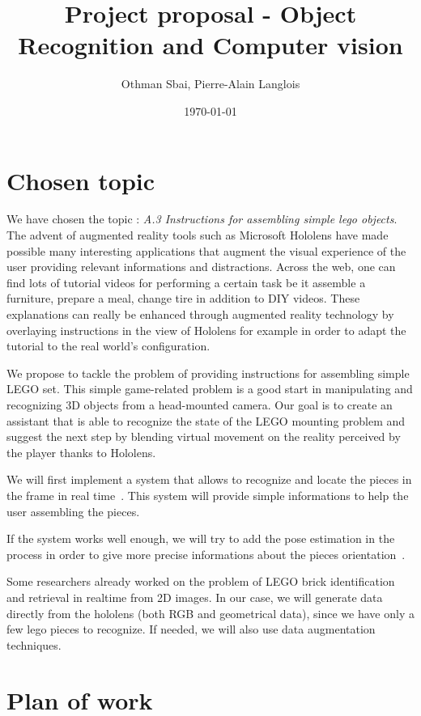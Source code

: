 \documentclass[a4paper,10pt]{article}
\title{Project proposal - Object Recognition and Computer vision}
\author{Othman Sbai, Pierre-Alain Langlois}
\date\today
\begin{document}
\maketitle
\section{Chosen topic}
We have chosen the topic : \emph{A.3 Instructions for assembling simple lego objects}.
\smallbreak
The advent of augmented reality tools such as Microsoft Hololens have made possible many interesting 
applications that augment the visual experience of the user providing relevant informations and 
distractions. Across the web, one can find lots of tutorial videos for performing a certain task be it 
assemble a furniture, prepare a meal, change tire in addition to DIY videos. These explanations can 
really be enhanced through augmented reality technology by overlaying instructions in the view of Hololens 
for example in order to adapt the tutorial to the real world’s configuration. 
\smallbreak

We propose to tackle the problem of providing instructions for assembling simple LEGO set. This simple 
game-related problem is a good start in manipulating and recognizing 3D objects from a head-mounted camera. 
Our goal is to create an assistant that is able to recognize the state of the LEGO mounting problem and 
suggest the next step by blending virtual movement on the reality perceived by the player thanks to 
Hololens.

\smallbreak

We will first implement a system that allows to recognize and locate the pieces in the frame in real time~\cite{redmon_you_2015}. 
This system will provide simple informations to help the user assembling the pieces.

If the system works well enough, we will try to add the pose estimation in the process in order to give 
more precise informations about the pieces orientation~\cite{wohlhart_learning_2015}.

\smallbreak
Some researchers already worked on the problem of LEGO brick identification and retrieval in realtime from 
2D images\cite{botha_realtime_2009}. In our case, we will generate data directly from the hololens (both 
RGB and geometrical data), since we have only a few lego pieces to recognize. If needed, we will also use 
data augmentation techniques. 
 
\section{Plan of work}
\end{document}
